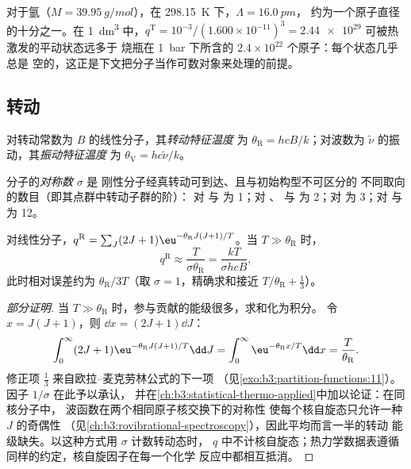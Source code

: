 \begin{example}[烧瓶中的氩]\label{ex:b3:partition-functions:argon}
对于氩（$M = \qty{39.95}{g/mol}$），在 \qty{298.15}{K} 下，$\Lambda = \qty{16.0}{pm}$，
约为一个原子直径的十分之一。在 \qty{1}{dm^3} 中，$q^{\mathrm T} = 10^{-3}/(1.600\times10^{-11})^3 = \num{2.44e29}$
可被热激发的平动状态远多于
烧瓶在 \qty{1}{bar} 下所含的 $2.4\times10^{22}$ 个原子：每个状态几乎总是
空的，这正是下文把分子当作可数对象来处理的前提。
\end{example}

\subsection*{转动}

\begin{definition}[特征温度]\label{def:b3:partition-functions:characteristic-temperature}
对转动常数为 $B$ 的线性分子，其\emph{转动特征温度}
为 $\theta_{\mathrm R} =
hcB/k$；对波数为 $\tilde\nu$ 的振动，其\emph{振动特征温度}
为 $\theta_{\mathrm V} =
hc\tilde\nu/k$。
\end{definition}

\begin{definition}[对称数]\label{def:b3:partition-functions:symmetry-number}
分子的\emph{对称数} $\sigma$ 是
刚性分子经真转动可到达、且与初始构型不可区分的
不同取向的数目（即其点群中转动子群的阶）：
对  与  为 1；对 、
 与  为 2；对  为 3；对  与  为 12。
\end{definition}

\begin{proposition}[转动配分函数]\label{prop:b3:partition-functions:q-rot}
对线性分子，$q^{\mathrm R} = \sum_J(2J+1)\eu^{-\theta_{\mathrm R}J(J+1)/T}$。当 $T \gg
\theta_{\mathrm R}$ 时，
\[
  q^{\mathrm R} \approx \frac{T}{\sigma\theta_{\mathrm R}} = \frac{kT}{\sigma hcB},
\]
此时相对误差约为 $\theta_{\mathrm R}/3T$（取 $\sigma = 1$，精确求和接近
$T/\theta_{\mathrm R} + \frac13$）。
\end{proposition}

\begin{proof}[部分证明]
当 $T \gg \theta_{\mathrm R}$ 时，参与贡献的能级很多，求和化为积分。
令 $x = J(J+1)$，则 $\dd x = (2J+1)\dd J$：
\[
  \int_0^\infty(2J+1)\eu^{-\theta_{\mathrm R}J(J+1)/T}\dd J = \int_0^\infty\eu^{-\theta_{\mathrm R}x/T}\dd x
  = \frac{T}{\theta_{\mathrm R}}.
\]
修正项 $\frac13$ 来自欧拉–麦克劳林公式的下一项
（见\cref{exo:b3:partition-functions:11}）。因子 $1/\sigma$ 在此予以承认，
并在\cref{ch:b3:statistical-thermo-applied}中加以论证：在同核分子中，
波函数在两个相同原子核交换下的对称性
使每个核自旋态只允许一种 $J$ 的奇偶性
（见\cref{ch:b3:rovibrational-spectroscopy}），因此平均而言一半的转动
能级缺失。以这种方式用 $\sigma$ 计数转动态时，
$q$ 中不计核自旋态；热力学数据表遵循
同样的约定，核自旋因子在每一个化学
反应中都相互抵消。
\end{proof}

